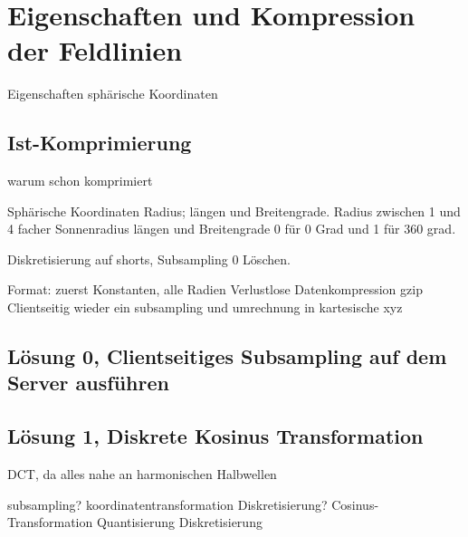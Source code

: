 \section{Eigenschaften und Kompression der Feldlinien}
Eigenschaften
sphärische Koordinaten

\subsection{Ist-Komprimierung}
warum schon komprimiert

Sphärische Koordinaten Radius; längen und Breitengrade.
Radius zwischen 1 und 4 facher Sonnenradius
längen und Breitengrade 0 für 0 Grad und 1 für 360 grad.

Diskretisierung auf shorts, 
Subsampling
0 Löschen.

Format: zuerst Konstanten, alle Radien
Verlustlose Datenkompression gzip
Clientseitig wieder ein subsampling und umrechnung in kartesische xyz

	
\subsection{Lösung 0, Clientseitiges Subsampling auf dem Server ausführen}

\subsection{Lösung 1, Diskrete Kosinus Transformation}
DCT, da alles nahe an harmonischen Halbwellen

subsampling?
koordinatentransformation
Diskretisierung?
Cosinus-Transformation
Quantisierung
Diskretisierung



